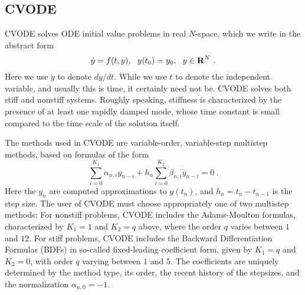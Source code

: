 \subsection{CVODE}

CVODE solves ODE initial value problems in real $N$-space, which we
write in the abstract form
\begin{equation}
  \dot{y} = f(t,y),~~ y(t_0) = y_0,~~ y \in \mbox{\bf R}^N ~.
\label{ODE} \end{equation}
Here we use $\dot{y}$ to denote $dy/dt$.  While we use $t$ to denote
the independent variable, and usually this is time, it certainly need
not be.  CVODE solves both stiff and nonstiff systems.  Roughly
speaking, stiffness is characterized by the presence of at least one
rapidly damped mode, whose time constant is small compared to the time
scale of the solution itself.

The methods used in CVODE are variable-order, variable-step multistep
methods, based on formulas of the form
\begin{equation}
 \sum_{i = 0}^{K_1} \alpha_{n,i} y_{n-i} + 
     h_n \sum_{i = 0}^{K_2} \beta_{n,i} \dot{y}_{n-i} = 0 ~.
\label{LMM} \end{equation}
Here the $y_n$ are computed approximations to $y(t_n)$, and
$h_n = t_n - t_{n-1}$ is the step size.  The user of CVODE must choose
appropriately one of two multistep methods: For nonstiff problems,
CVODE includes the Adams-Moulton formulas, characterized by $K_1 = 1$
and $K_2 = q$ above, where the order $q$ varies between $1$ and $12$.
For stiff problems, CVODE includes the Backward Differentiation
Formulas (BDFs) in so-called fixed-leading coefficient form, given by
$K_1 = q$ and $K_2 = 0$, with order $q$ varying between $1$ and $5$.
The coefficients are uniquely determined by the method type, its
order, the recent history of the stepsizes, and the normalization
$\alpha_{n,0} = -1$.

